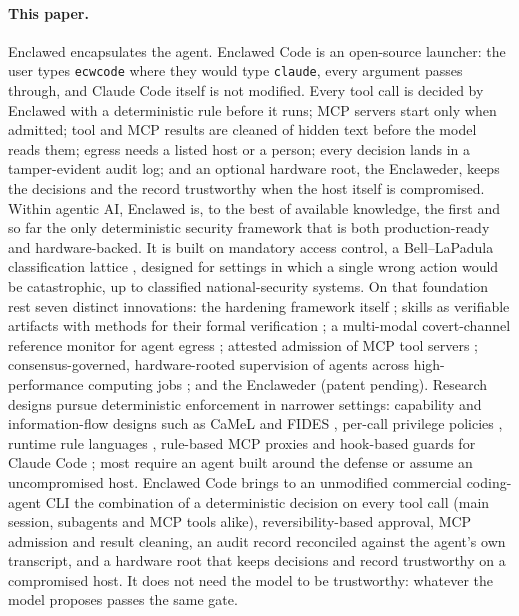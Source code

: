 \documentclass[11pt]{article}
\newcommand{\sys}{Enclawed}
\newcommand{\dev}{Enclaweder}
\newcommand{\cz}{Enclawed Code}
\begin{document}
\paragraph{This paper.} \sys{} encapsulates the agent. \cz{} is an
open-source launcher: the user types \texttt{ecwcode} where they
would type \texttt{claude}, every argument passes through, and Claude
Code itself is not modified. Every tool call is decided by \sys{} with a
deterministic rule before it runs; MCP servers start only when admitted;
tool and MCP results are cleaned of hidden text before the model reads
them; egress needs a listed host or a person; every decision lands in a
tamper-evident audit log; and an optional hardware root, the \dev{},
keeps the decisions and the record trustworthy when the host itself is
compromised. Within agentic AI, \sys{} is, to the best of available
knowledge, the first and so far the only deterministic security
framework that is both production-ready and hardware-backed. It is built
on mandatory access control, a Bell--LaPadula classification lattice
\cite{bell-lapadula,metere2026framework}, designed for settings in which
a single wrong action would be catastrophic, up to classified
national-security systems. On that foundation rest seven distinct
innovations: the hardening framework itself \cite{metere2026framework};
skills as verifiable artifacts \cite{metere2026trust} with methods for
their formal verification \cite{metere2026formal}; a multi-modal
covert-channel reference monitor for agent egress
\cite{metere2026covertegress}; attested admission of MCP tool servers
\cite{metere2026mcpadmission}; consensus-governed, hardware-rooted
supervision of agents across high-performance computing jobs
\cite{metere2026hpc}; and the \dev{} (patent pending). Research designs
pursue deterministic enforcement in narrower settings: capability and
information-flow designs such as CaMeL and FIDES
\cite{debenedetti2025camel,costa2025fides}, per-call privilege policies
\cite{shi2025progent}, runtime rule languages \cite{wang2026agentspec},
rule-based MCP proxies \cite{invariant2025guardrails} and hook-based
guards for Claude Code \cite{armorcode2026hooks}; most require an agent
built around the defense or assume an uncompromised host. \cz{} brings
to an unmodified commercial coding-agent CLI the combination of a
deterministic decision on every tool call (main session, subagents and
MCP tools alike), reversibility-based approval, MCP admission and result
cleaning, an audit record reconciled against the agent's own transcript,
and a hardware root that keeps decisions and record trustworthy on a
compromised host. It does not need the model to be trustworthy: whatever
the model proposes passes the same gate.
\end{document}
